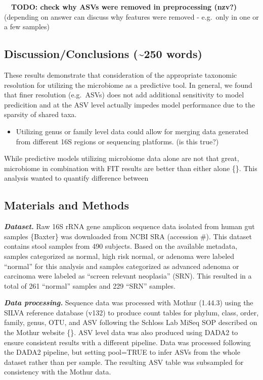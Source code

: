 \documentclass[
]{article}
\providecommand{\tightlist}{%
  \setlength{\itemsep}{0pt}\setlength{\parskip}{0pt}}
\begin{document}
~~\textbf{TODO: check why ASVs were removed in preprocessing (nzv?)}\\
\hspace*{0.333em}\hspace*{0.333em}(depending on answer can discuss why
features were removed - e.g.~only in one or a few samples)

\hypertarget{discussionconclusions-250-words}{%
\subsection{Discussion/Conclusions (\textasciitilde250
words)}\label{discussionconclusions-250-words}}

These results demonstrate that consideration of the appropriate
taxonomic resolution for utilizing the microbiome as a predictive tool.
In general, we found that finer resolution (e.g.~ASVs) does not add
additional sensitivity to model predicition and at the ASV level
actually impedes model performance due to the sparsity of shared taxa.

\begin{itemize}
\tightlist
\item
  Utilizing genus or family level data could allow for merging data
  generated from different 16S regions or sequencing platforms. (is this
  true?)
\end{itemize}

While predictive models utilizing microbiome data alone are not that
great, microbiome in combination with FIT results are better than either
alone \{\}. This analysis wanted to quantify difference between

\hypertarget{materials-and-methods}{%
\subsection{Materials and Methods}\label{materials-and-methods}}

\textbf{\emph{Dataset.}} Raw 16S rRNA gene amplicon sequence data
isolated from human gut samples \{Baxter\} was downloaded from NCBI SRA
(accession \#). This dataset contains stool samples from 490 subjects.
Based on the available metadata, samples categorized as normal, high
risk normal, or adenoma were labeled ``normal'' for this analysis and
samples categorized as advanced adenoma or carcinoma were labeled as
``screen relevant neoplasia'' (SRN). This resulted in a total of 261
``normal'' samples and 229 ``SRN'' samples.

\textbf{\emph{Data processing.}} Sequence data was processed with Mothur
(1.44.3) using the SILVA reference database (v132) to produce count
tables for phylum, class, order, family, genus, OTU, and ASV following
the Schloss Lab MiSeq SOP described on the Mothur website \{\}. ASV
level data was also produced using DADA2 to ensure consistent results
with a different pipeline. Data was processed following the DADA2
pipeline, but setting pool=TRUE to infer ASVs from the whole dataset
rather than per sample. The resulting ASV table was subsampled for
consistency with the Mothur data.
\end{document}
